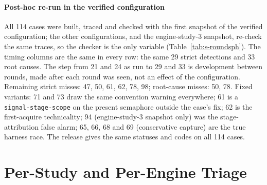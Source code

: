 \documentclass[acmtog,anonymous,review]{acmart}
\newcommand{\code}[1]{\texttt{#1}}
\begin{document}
\paragraph{Post-hoc re-run in the verified configuration}
All 114 cases were built, traced and checked with the first snapshot of the verified configuration; the other
configurations, and the engine-study-3 snapshot, re-check the same traces, so the checker is the only variable
(Table~\ref{tab:s-roundsph}). The timing columns are the same in every row: the same 29 strict detections and 33 root
causes. The step from 21 and 24 as run to 29 and 33 is development between rounds, made after each round was seen, not
an effect of the configuration. Remaining strict misses: 47, 50, 61, 62, 78, 98; root-cause misses: 50, 78. Fixed
variants: 71 and 73 draw the same convention warning everywhere; 61 is a \code{signal-stage-scope} on the present
semaphore outside the case's fix; 62 is the first-acquire technicality; 94 (engine-study-3 snapshot only) was the
stage-attribution false alarm; 65, 66, 68 and 69 (conservative capture) are the true harness race. The release gives
the same statuses and codes on all 114 cases.

\begin{table}[htbp]
\caption{Blind timing cases and fixed variants, re-run on traces recorded for the first snapshot of the verified
configuration (post-hoc), per configuration; the first row re-checks the same traces with the engine-study-3
snapshot.}
\label{tab:s-roundsph}
\scriptsize
{}
\end{table}

\section{Per-Study and Per-Engine Triage}
\label{sup:triage}
\end{document}
